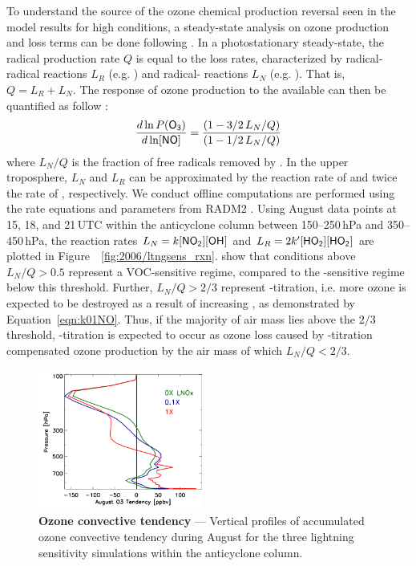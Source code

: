 To understand the source of the ozone chemical production reversal seen in the model results for high 
conditions, a steady-state analysis on ozone production and loss terms can be done following \citet{Kleinman:1997vn}.
In a photostationary steady-state, the radical production rate $Q$ is equal to the loss rates, characterized by radical-radical
reactions $L_R$ (e.g. ) and radical- reactions $L_N$ (e.g. ).
That is, $Q=L_R+L_N$. The response of ozone production to the available  can then be quantified
as follow \citep{Kleinman:1997vn}:
\begin{equation}\label{eqn:k01NO}
	\frac{d\ln P(\chem{O_3})}{d\ln[\chem{NO}]} = \frac{(1-3/2\,L_N/Q)}{(1-1/2\,L_N/Q)}
\end{equation}
where $L_N/Q$ is the fraction of free radicals removed by . In the upper troposphere, $L_N$ and $L_R$ can be
approximated by the reaction rate of  and twice the rate of , respectively. We conduct
offline computations are performed using the rate equations and parameters from RADM2
\citep[][and references therein]{Stockwell:1990ez}. Using August data points at 15, 18, and 21\,\unit{UTC} within
the anticyclone column between 150--250\,\unit{hPa} and 350--450\,\unit{hPa}, the reaction rates
$L_N=k\chem{[NO_2][OH]}$ and $L_R=2k'\chem{[HO_2][HO_2]}$ are plotted in Figure~~\ref{fig:2006/ltngsens_rxn}.
\citet{Kleinman:2001fk} show that conditions above $L_N/Q>0.5$ represent a VOC-sensitive regime, compared
to the -sensitive regime below this threshold. Further, $L_N/Q>2/3$ represent -titration,
i.e. more ozone is expected to be destroyed as a result of increasing , as demonstrated by Equation~\ref{eqn:k01NO}.
Thus, if the majority of air mass lies above the $2/3$ threshold, -titration is expected to occur as
ozone loss caused by -titration compensated ozone production by the air mass of which $L_N/Q<2/3$.

	\begin{figure}
		\centering
		\vspace{-.3in}
		\begin{singlespacing}
		\includegraphics[width=0.48\textwidth]{sens/ltngsens_o3conv}
		\caption[- model correlation]{{\label{fig:2006/ltngsens_o3conv}
		\small\textbf{Ozone convective tendency} --- Vertical profiles of accumulated ozone convective
		tendency during August for the three lightning sensitivity simulations within the anticyclone column.
		\vspace{-.3in}}}
		\end{singlespacing}
	\end{figure}

